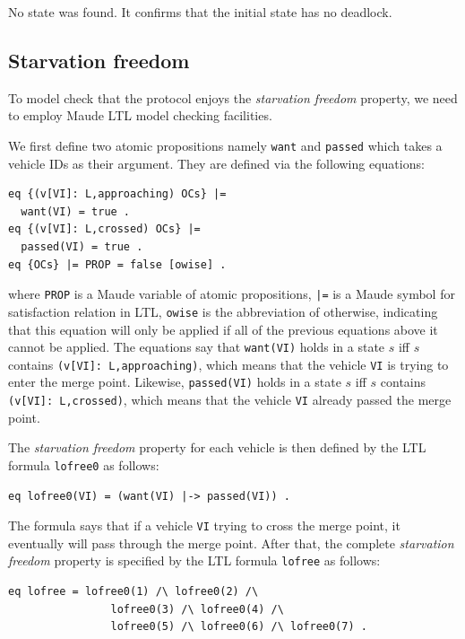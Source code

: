 \documentclass[10pt, conference, compsocconf]{IEEEtran}
\begin{document}
\noindent
No state was found. It confirms that the initial state has no deadlock.


\subsection{Starvation freedom}
To model check that the protocol enjoys the \textit{starvation freedom} property, 
we need to employ Maude LTL model checking facilities.

We first define two atomic propositions namely \verb!want! and \verb!passed! 
which takes a vehicle IDs as their argument. 
They are defined via the following equations:

\begin{small}
\begin{verbatim}
eq {(v[VI]: L,approaching) OCs} |= 
  want(VI) = true .
eq {(v[VI]: L,crossed) OCs} |= 
  passed(VI) = true .
eq {OCs} |= PROP = false [owise] .
\end{verbatim}
\end{small}

\noindent
where \verb!PROP! is a Maude variable of atomic propositions, 
\verb!|=! is a Maude symbol for satisfaction relation in LTL,
\verb!owise! is the abbreviation of otherwise, indicating that 
this equation will only be applied if all of the previous 
equations above it cannot be applied. 
The equations say that \verb!want(VI)! holds in a state $s$ iff $s$ 
contains \verb!(v[VI]: L,approaching)!, which means that the vehicle 
\verb!VI! is trying to enter the merge point. 
Likewise, \verb!passed(VI)! holds in a state $s$ iff $s$ contains 
\verb!(v[VI]: L,crossed)!, which means that the vehicle \verb!VI! 
already passed the merge point. 

The \textit{starvation freedom} property for each vehicle is then 
defined by the LTL formula \verb!lofree0! as follows:

\begin{small}
\begin{verbatim}
eq lofree0(VI) = (want(VI) |-> passed(VI)) .
\end{verbatim}
\end{small}

\noindent
The formula says that if a vehicle \verb!VI! trying to cross the merge point, 
it eventually will pass through the merge point.
After that, the complete \textit{starvation freedom} property is specified 
by the LTL formula \verb!lofree! as follows:

\begin{small}
\begin{verbatim}
eq lofree = lofree0(1) /\ lofree0(2) /\ 
				lofree0(3) /\ lofree0(4) /\ 
				lofree0(5) /\ lofree0(6) /\ lofree0(7) .
\end{verbatim}
\end{small}
\end{document}

